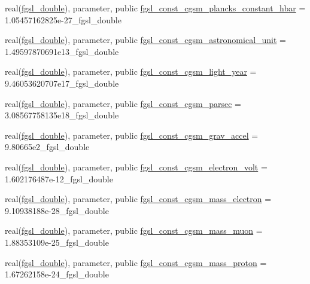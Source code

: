 \begin{DoxyCompactItemize}
\item 
real(\hyperlink{namespacefgsl_a9af5113378e0f000eb479d3f90196ddf}{fgsl\+\_\+double}), parameter, public \hyperlink{namespacefgsl_a59a3499a4c13d0d58c0aa1470c6c589a}{fgsl\+\_\+const\+\_\+cgsm\+\_\+plancks\+\_\+constant\+\_\+hbar} = 1.\+05457162825e-\/27\+\_\+fgsl\+\_\+double
\item 
real(\hyperlink{namespacefgsl_a9af5113378e0f000eb479d3f90196ddf}{fgsl\+\_\+double}), parameter, public \hyperlink{namespacefgsl_af1dd23df42a3363f75423e5d3ff79cde}{fgsl\+\_\+const\+\_\+cgsm\+\_\+astronomical\+\_\+unit} = 1.\+49597870691e13\+\_\+fgsl\+\_\+double
\item 
real(\hyperlink{namespacefgsl_a9af5113378e0f000eb479d3f90196ddf}{fgsl\+\_\+double}), parameter, public \hyperlink{namespacefgsl_a7a0fc1754861e860249707775c149bd8}{fgsl\+\_\+const\+\_\+cgsm\+\_\+light\+\_\+year} = 9.\+46053620707e17\+\_\+fgsl\+\_\+double
\item 
real(\hyperlink{namespacefgsl_a9af5113378e0f000eb479d3f90196ddf}{fgsl\+\_\+double}), parameter, public \hyperlink{namespacefgsl_a3eb251959ceffa5d3604d70bd5279f02}{fgsl\+\_\+const\+\_\+cgsm\+\_\+parsec} = 3.\+08567758135e18\+\_\+fgsl\+\_\+double
\item 
real(\hyperlink{namespacefgsl_a9af5113378e0f000eb479d3f90196ddf}{fgsl\+\_\+double}), parameter, public \hyperlink{namespacefgsl_abcdb6fe4c8e314d2d05ee14a854357fd}{fgsl\+\_\+const\+\_\+cgsm\+\_\+grav\+\_\+accel} = 9.\+80665e2\+\_\+fgsl\+\_\+double
\item 
real(\hyperlink{namespacefgsl_a9af5113378e0f000eb479d3f90196ddf}{fgsl\+\_\+double}), parameter, public \hyperlink{namespacefgsl_aeec1dd933fc3bc5a582363056455d46c}{fgsl\+\_\+const\+\_\+cgsm\+\_\+electron\+\_\+volt} = 1.\+602176487e-\/12\+\_\+fgsl\+\_\+double
\item 
real(\hyperlink{namespacefgsl_a9af5113378e0f000eb479d3f90196ddf}{fgsl\+\_\+double}), parameter, public \hyperlink{namespacefgsl_a8b5c993b964f03b76098558c24095fd4}{fgsl\+\_\+const\+\_\+cgsm\+\_\+mass\+\_\+electron} = 9.\+10938188e-\/28\+\_\+fgsl\+\_\+double
\item 
real(\hyperlink{namespacefgsl_a9af5113378e0f000eb479d3f90196ddf}{fgsl\+\_\+double}), parameter, public \hyperlink{namespacefgsl_a3092e1888259499b77e1dc358db86c58}{fgsl\+\_\+const\+\_\+cgsm\+\_\+mass\+\_\+muon} = 1.\+88353109e-\/25\+\_\+fgsl\+\_\+double
\item 
real(\hyperlink{namespacefgsl_a9af5113378e0f000eb479d3f90196ddf}{fgsl\+\_\+double}), parameter, public \hyperlink{namespacefgsl_aefda043fac3adf36e5c9142193d24ef6}{fgsl\+\_\+const\+\_\+cgsm\+\_\+mass\+\_\+proton} = 1.\+67262158e-\/24\+\_\+fgsl\+\_\+double

\end{DoxyCompactItemize}
